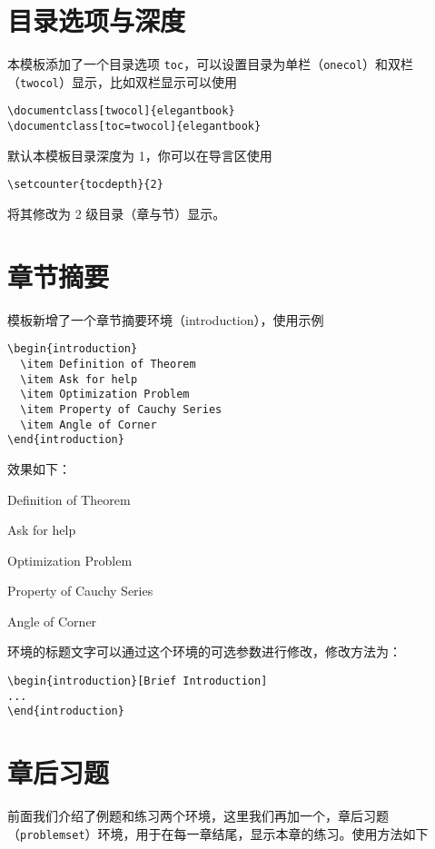 \documentclass[cn,11pt]{elegantbook}
\begin{document}
\section{目录选项与深度}
本模板添加了一个目录选项 \lstinline{toc}，可以设置目录为单栏（\lstinline{onecol}）和双栏（\lstinline{twocol}）显示，比如双栏显示可以使用
\begin{lstlisting}
\documentclass[twocol]{elegantbook}
\documentclass[toc=twocol]{elegantbook}
\end{lstlisting}

默认本模板目录深度为 1，你可以在导言区使用
\begin{lstlisting}
\setcounter{tocdepth}{2}
\end{lstlisting}
将其修改为 2 级目录（章与节）显示。


\section{章节摘要}
模板新增了一个章节摘要环境（introduction），使用示例
\begin{lstlisting}
\begin{introduction}
  \item Definition of Theorem
  \item Ask for help
  \item Optimization Problem
  \item Property of Cauchy Series
  \item Angle of Corner
\end{introduction}
\end{lstlisting}
效果如下：
\begin{introduction}
  \item Definition of Theorem
  \item Ask for help
  \item Optimization Problem
  \item Property of Cauchy Series
  \item Angle of Corner
\end{introduction}

环境的标题文字可以通过这个环境的可选参数进行修改，修改方法为：
\begin{lstlisting}
\begin{introduction}[Brief Introduction]
...
\end{introduction}
\end{lstlisting}

\section{章后习题}
前面我们介绍了例题和练习两个环境，这里我们再加一个，章后习题（\lstinline{problemset}）环境，用于在每一章结尾，显示本章的练习。使用方法如下
\end{document}
